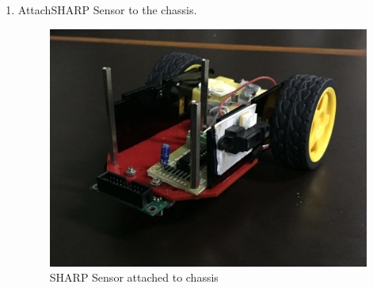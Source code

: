 \documentclass[a4paper,12pt,oneside]{book}
\begin{document}
\begin{enumerate}
\item AttachSHARP Sensor to the chassis.
\begin{figure}[h]
        \centering
        \includegraphics[scale=0.16]{a_sharp}
        \caption{SHARP Sensor attached to chassis}
      \end{figure}
      \newpage


\end{enumerate}
\end{document}
